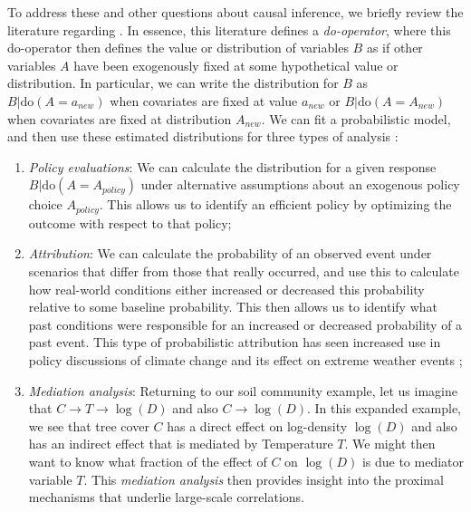 To address these and other questions about causal inference, we briefly review the literature regarding  \cite{pearl_causal_2009,pearl_causality_2009}.  In essence, this literature defines a \textit{do-operator}, where this do-operator then defines the value or distribution of variables \(B\) as if other variables \(A\) have been exogenously fixed at some hypothetical value or distribution.  In particular, we can write the distribution for \(B\) as \(B| \mathrm{do}(A=a_{new})\) when covariates are fixed at value \(a_{new}\) or \(B| \mathrm{do}(A=A_{new})\) when covariates are fixed at distribution  \(A_{new}\).  We can fit a probabilistic model, and then use these estimated distributions for three types of analysis \cite{pearl_causal_2009}:
\begin{enumerate}
    \item \textit{Policy evaluations}: We can calculate the distribution for a given response \(B | \mathrm{do}(A=A_{policy}) \) under alternative assumptions about an exogenous policy choice \(A_{policy}\).  This allows us to identify an efficient policy by optimizing the outcome with respect to that policy;

    \item \textit{Attribution}: We can calculate the probability of an observed event under scenarios that differ from those that really occurred, and use this to calculate how real-world conditions either increased or decreased this probability relative to some baseline probability.  This then allows us to identify what past conditions were responsible for an increased or decreased probability of a past event. This type of probabilistic attribution has seen increased use in policy discussions of climate change and its effect on extreme weather events \cite{naveau_statistical_2020};  

    \item \textit{Mediation analysis}:  Returning to our soil community example, let us imagine that \( C \rightarrow T \rightarrow \log(D)\) and also \(C \rightarrow \log(D)\). In this expanded example, we see that tree cover \(C\) has a direct effect on log-density \(\log(D)\) and also has an indirect effect that is mediated by Temperature \(T\).  We might then want to know what fraction of the effect of \(C\) on \(\log(D)\) is due to mediator variable \(T\).  This \textit{mediation analysis} then provides insight into the proximal mechanisms that underlie large-scale correlations. 
\end{enumerate}

